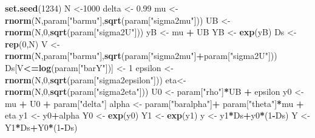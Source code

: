 \documentclass[]{book}
\newenvironment{Shaded}{\begin{snugshade}}{\end{snugshade}}
\newcommand{\KeywordTok}[1]{\textcolor[rgb]{0.13,0.29,0.53}{\textbf{#1}}}
\newcommand{\DecValTok}[1]{\textcolor[rgb]{0.00,0.00,0.81}{#1}}
\newcommand{\FloatTok}[1]{\textcolor[rgb]{0.00,0.00,0.81}{#1}}
\newcommand{\StringTok}[1]{\textcolor[rgb]{0.31,0.60,0.02}{#1}}
\newcommand{\OperatorTok}[1]{\textcolor[rgb]{0.81,0.36,0.00}{\textbf{#1}}}
\newcommand{\NormalTok}[1]{#1}
\theoremstyle{definition}
\theoremstyle{definition}
\theoremstyle{definition}
\theoremstyle{remark}
\begin{document}
\begin{Shaded}
\begin{Highlighting}[]
\KeywordTok{set.seed}\NormalTok{(}\DecValTok{1234}\NormalTok{)}
\NormalTok{N <-}\DecValTok{1000}
\NormalTok{delta <-}\StringTok{ }\FloatTok{0.99}
\NormalTok{mu <-}\StringTok{ }\KeywordTok{rnorm}\NormalTok{(N,param[}\StringTok{"barmu"}\NormalTok{],}\KeywordTok{sqrt}\NormalTok{(param[}\StringTok{"sigma2mu"}\NormalTok{]))}
\NormalTok{UB <-}\StringTok{ }\KeywordTok{rnorm}\NormalTok{(N,}\DecValTok{0}\NormalTok{,}\KeywordTok{sqrt}\NormalTok{(param[}\StringTok{"sigma2U"}\NormalTok{]))}
\NormalTok{yB <-}\StringTok{ }\NormalTok{mu }\OperatorTok{+}\StringTok{ }\NormalTok{UB }
\NormalTok{YB <-}\StringTok{ }\KeywordTok{exp}\NormalTok{(yB)}
\NormalTok{Ds <-}\StringTok{ }\KeywordTok{rep}\NormalTok{(}\DecValTok{0}\NormalTok{,N)}
\NormalTok{V <-}\StringTok{ }\KeywordTok{rnorm}\NormalTok{(N,param[}\StringTok{"barmu"}\NormalTok{],}\KeywordTok{sqrt}\NormalTok{(param[}\StringTok{"sigma2mu"}\NormalTok{]}\OperatorTok{+}\NormalTok{param[}\StringTok{"sigma2U"}\NormalTok{]))}
\NormalTok{Ds[V}\OperatorTok{<=}\KeywordTok{log}\NormalTok{(param[}\StringTok{"barY"}\NormalTok{])] <-}\StringTok{ }\DecValTok{1} 
\NormalTok{epsilon <-}\StringTok{ }\KeywordTok{rnorm}\NormalTok{(N,}\DecValTok{0}\NormalTok{,}\KeywordTok{sqrt}\NormalTok{(param[}\StringTok{"sigma2epsilon"}\NormalTok{]))}
\NormalTok{eta<-}\StringTok{ }\KeywordTok{rnorm}\NormalTok{(N,}\DecValTok{0}\NormalTok{,}\KeywordTok{sqrt}\NormalTok{(param[}\StringTok{"sigma2eta"}\NormalTok{]))}
\NormalTok{U0 <-}\StringTok{ }\NormalTok{param[}\StringTok{"rho"}\NormalTok{]}\OperatorTok{*}\NormalTok{UB }\OperatorTok{+}\StringTok{ }\NormalTok{epsilon}
\NormalTok{y0 <-}\StringTok{ }\NormalTok{mu }\OperatorTok{+}\StringTok{  }\NormalTok{U0 }\OperatorTok{+}\StringTok{ }\NormalTok{param[}\StringTok{"delta"}\NormalTok{]}
\NormalTok{alpha <-}\StringTok{ }\NormalTok{param[}\StringTok{"baralpha"}\NormalTok{]}\OperatorTok{+}\StringTok{  }\NormalTok{param[}\StringTok{"theta"}\NormalTok{]}\OperatorTok{*}\NormalTok{mu }\OperatorTok{+}\StringTok{ }\NormalTok{eta}
\NormalTok{y1 <-}\StringTok{ }\NormalTok{y0}\OperatorTok{+}\NormalTok{alpha}
\NormalTok{Y0 <-}\StringTok{ }\KeywordTok{exp}\NormalTok{(y0)}
\NormalTok{Y1 <-}\StringTok{ }\KeywordTok{exp}\NormalTok{(y1)}
\NormalTok{y <-}\StringTok{ }\NormalTok{y1}\OperatorTok{*}\NormalTok{Ds}\OperatorTok{+}\NormalTok{y0}\OperatorTok{*}\NormalTok{(}\DecValTok{1}\OperatorTok{-}\NormalTok{Ds)}
\NormalTok{Y <-}\StringTok{ }\NormalTok{Y1}\OperatorTok{*}\NormalTok{Ds}\OperatorTok{+}\NormalTok{Y0}\OperatorTok{*}\NormalTok{(}\DecValTok{1}\OperatorTok{-}\NormalTok{Ds)}
\end{Highlighting}
\end{Shaded}
\end{document}
